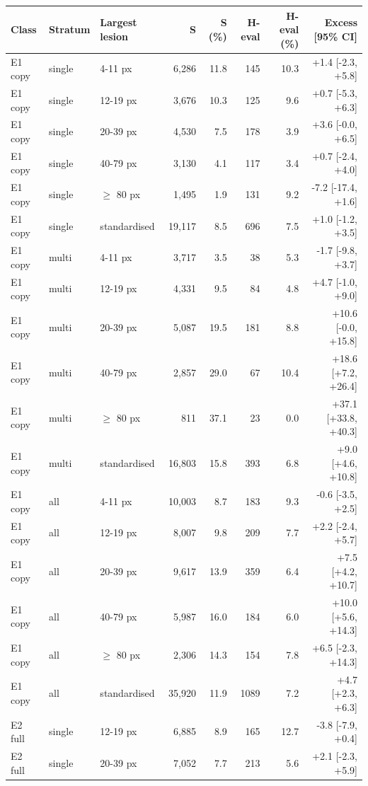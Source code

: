 \begin{table}
\centering
\scriptsize
\begin{tabular}{lllrrrrr}
\toprule
Class & Stratum & Largest lesion & S & S (\%) & H-eval & H-eval (\%) & Excess [95\% CI] \\
\midrule
E1 copy & single & 4-11 px & 6,286 & 11.8 & 145 & 10.3 & +1.4 [-2.3, +5.8] \\
E1 copy & single & 12-19 px & 3,676 & 10.3 & 125 & 9.6 & +0.7 [-5.3, +6.3] \\
E1 copy & single & 20-39 px & 4,530 & 7.5 & 178 & 3.9 & +3.6 [-0.0, +6.5] \\
E1 copy & single & 40-79 px & 3,130 & 4.1 & 117 & 3.4 & +0.7 [-2.4, +4.0] \\
E1 copy & single & $\geq$ 80 px & 1,495 & 1.9 & 131 & 9.2 & -7.2 [-17.4, +1.6] \\
E1 copy & single & standardised & 19,117 & 8.5 & 696 & 7.5 & +1.0 [-1.2, +3.5] \\
E1 copy & multi & 4-11 px & 3,717 & 3.5 & 38 & 5.3 & -1.7 [-9.8, +3.7] \\
E1 copy & multi & 12-19 px & 4,331 & 9.5 & 84 & 4.8 & +4.7 [-1.0, +9.0] \\
E1 copy & multi & 20-39 px & 5,087 & 19.5 & 181 & 8.8 & +10.6 [-0.0, +15.8] \\
E1 copy & multi & 40-79 px & 2,857 & 29.0 & 67 & 10.4 & +18.6 [+7.2, +26.4] \\
E1 copy & multi & $\geq$ 80 px & 811 & 37.1 & 23 & 0.0 & +37.1 [+33.8, +40.3] \\
E1 copy & multi & standardised & 16,803 & 15.8 & 393 & 6.8 & +9.0 [+4.6, +10.8] \\
E1 copy & all & 4-11 px & 10,003 & 8.7 & 183 & 9.3 & -0.6 [-3.5, +2.5] \\
E1 copy & all & 12-19 px & 8,007 & 9.8 & 209 & 7.7 & +2.2 [-2.4, +5.7] \\
E1 copy & all & 20-39 px & 9,617 & 13.9 & 359 & 6.4 & +7.5 [+4.2, +10.7] \\
E1 copy & all & 40-79 px & 5,987 & 16.0 & 184 & 6.0 & +10.0 [+5.6, +14.3] \\
E1 copy & all & $\geq$ 80 px & 2,306 & 14.3 & 154 & 7.8 & +6.5 [-2.3, +14.3] \\
E1 copy & all & standardised & 35,920 & 11.9 & 1089 & 7.2 & +4.7 [+2.3, +6.3] \\
E2 full & single & 12-19 px & 6,885 & 8.9 & 165 & 12.7 & -3.8 [-7.9, +0.4] \\
E2 full & single & 20-39 px & 7,052 & 7.7 & 213 & 5.6 & +2.1 [-2.3, +5.9] \\

\end{tabular}
\end{table}
